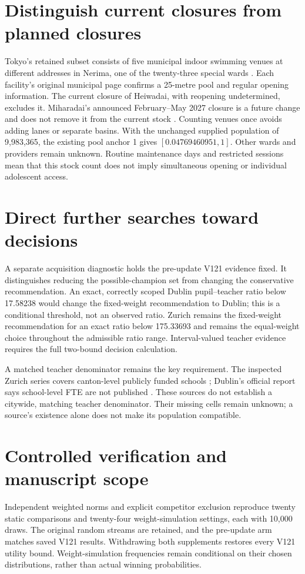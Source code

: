 \documentclass[12pt]{article}
\begin{document}
\section*{Distinguish current closures from planned closures}
Tokyo's retained subset consists of five municipal indoor swimming venues at
different addresses in Nerima, one of the twenty-three special wards
\cite{nerima}. Each facility's original municipal page confirms a 25-metre
pool and regular opening information. The current closure of Heiwadai, with
reopening undetermined, excludes it. Miharadai's announced February--May 2027
closure is a future change and does not remove it from the current stock
\cite{closures}. Counting venues once avoids adding lanes or separate basins.
With the unchanged supplied population of 9,983,365, the existing pool anchor
1 gives $[0.04769460951,1]$. Other wards and providers remain unknown.
Routine maintenance days and restricted sessions mean that this stock count
does not imply simultaneous opening or individual adolescent access.

\section*{Direct further searches toward decisions}
A separate acquisition diagnostic holds the pre-update V121 evidence fixed.
It distinguishes reducing the possible-champion set from changing the
conservative recommendation. An exact, correctly scoped Dublin pupil--teacher
ratio below 17.58238 would change the fixed-weight recommendation to Dublin;
this is a conditional threshold, not an observed ratio. Zurich remains the
fixed-weight recommendation for an exact ratio below 175.33693 and remains
the equal-weight choice throughout the admissible ratio range. Interval-valued
teacher evidence requires the full two-bound decision calculation.

A matched teacher denominator remains the key requirement. The inspected Zurich
series covers canton-level publicly funded schools \cite{zurichstaff}; Dublin's
official report says school-level FTE are not published \cite{irelandstaff}. These sources do not establish a citywide, matching
teacher denominator. Their missing cells remain unknown; a source's existence
alone does not make its population compatible.

\section*{Controlled verification and manuscript scope}
Independent weighted norms and explicit competitor exclusion reproduce twenty
static comparisons and twenty-four weight-simulation settings, each with
10,000 draws. The original random streams are retained, and the pre-update
arm matches saved V121 results. Withdrawing both supplements restores every
V121 utility bound. Weight-simulation frequencies remain conditional on their
chosen distributions, rather than actual winning probabilities.
\end{document}
